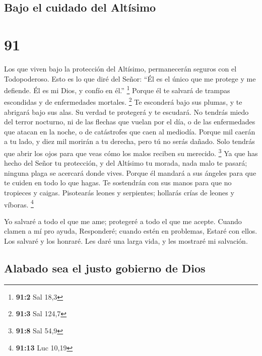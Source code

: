 \hypertarget{bajo-el-cuidado-del-altuxedsimo}{%
\subsection{Bajo el cuidado del
Altísimo}\label{bajo-el-cuidado-del-altuxedsimo}}

\hypertarget{section-90}{%
\section{91}\label{section-90}}

 Los que viven bajo la protección del Altísimo, permanecerán
seguros con el Todopoderoso.  Esto es lo que diré del Señor:
``Él es el único que me protege y me defiende. Él es mi Dios, y confío
en él.'' \footnote{\textbf{91:2} Sal 18,3}  Porque él te
salvará de trampas escondidas y de enfermedades mortales. \footnote{\textbf{91:3}
  Sal 124,7}  Te esconderá bajo sus plumas, y te abrigará
bajo sus alas. Su verdad te protegerá y te escudará.  No
tendrás miedo del terror nocturno, ni de las flechas que vuelan por el
día,  o de las enfermedades que atacan en la noche, o de
catástrofes que caen al mediodía.  Porque mil caerán a tu
lado, y diez mil morirán a tu derecha, pero tú no serás dañado.
 Solo tendrás que abrir los ojos para que veas cómo los
malos reciben su merecido. \footnote{\textbf{91:8} Sal 54,9}
 Ya que has hecho del Señor tu protección, y del Altísimo tu
morada,  nada malo te pasará; ninguna plaga se acercará
donde vives.  Porque él mandará a sus ángeles para que te
cuiden en todo lo que hagas.  Te sostendrán con sus manos
para que no tropieces y caigas.  Pisotearás leones y
serpientes; hollarás crías de leones y víboras. \footnote{\textbf{91:13}
  Luc 10,19}

 Yo salvaré a todo el que me ame; protegeré a todo el que
me acepte.  Cuando clamen a mí pro ayuda, Responderé;
cuando estén en problemas, Estaré con ellos. Los salvaré y los honraré.
 Les daré una larga vida, y les mostraré mi salvación.

\hypertarget{alabado-sea-el-justo-gobierno-de-dios}{%
\subsection{Alabado sea el justo gobierno de
Dios}\label{alabado-sea-el-justo-gobierno-de-dios}}

